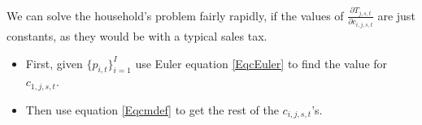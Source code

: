 


    We can solve the household's problem fairly rapidly, if the values of $\frac{\partial T_{j,s,t}}{\partial c_{i,j,s,t}}$ are just constants, as they would be with a typical sales tax.
    \begin{itemize}
    \item First, given $\{p_{i,t}\}_{i=1}^I$ use Euler equation \eqref{EqcEuler} to find the value for $c_{1,j,s,t}$.
    \item Then use equation \eqref{Eqcmdef} to get the rest of the $c_{i,j,s,t}$'s.
    \end{itemize}

